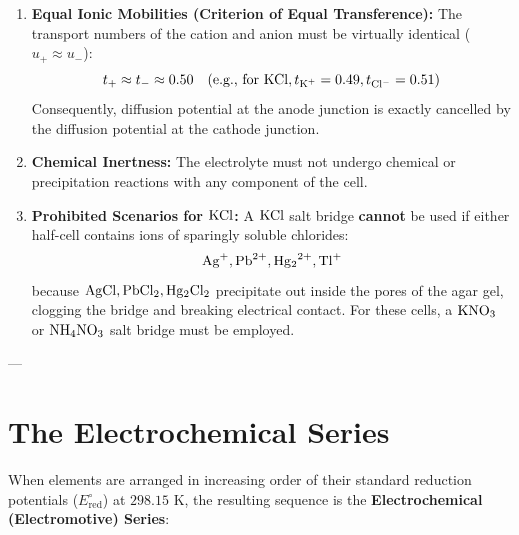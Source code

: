 \begin{conceptbox}
\begin{enumerate}[leftmargin=*]
    \item \textbf{Equal Ionic Mobilities (Criterion of Equal Transference):}
    The transport numbers of the cation and anion must be virtually identical ($u_+ \approx u_-$):
    \begin{equation}
        t_+ \approx t_- \approx 0.50 \quad (\text{e.g., for } \ce{KCl}, t_{\ce{K+}} = 0.49, t_{\ce{Cl-}} = 0.51)
    \end{equation}
    Consequently, diffusion potential at the anode junction is exactly cancelled by the diffusion potential at the cathode junction.
    \item \textbf{Chemical Inertness:} The electrolyte must not undergo chemical or precipitation reactions with any component of the cell.
    \item \textbf{Prohibited Scenarios for $\ce{KCl}$:}
    A $\ce{KCl}$ salt bridge \textbf{cannot} be used if either half-cell contains ions of sparingly soluble chlorides:
    \begin{equation}
        \ce{Ag+}, \ce{Pb^2+}, \ce{Hg2^2+}, \ce{Tl+}
    \end{equation}
    because $\ce{AgCl}, \ce{PbCl2}, \ce{Hg2Cl2}$ precipitate out inside the pores of the agar gel, clogging the bridge and breaking electrical contact. For these cells, a $\ce{KNO3}$ or $\ce{NH4NO3}$ salt bridge must be employed.
\end{enumerate}
\end{conceptbox}

---

\section{The Electrochemical Series}

When elements are arranged in increasing order of their standard reduction potentials ($E^\circ_{\text{red}}$) at $298.15\text{ K}$, the resulting sequence is the \textbf{Electrochemical (Electromotive) Series}:

